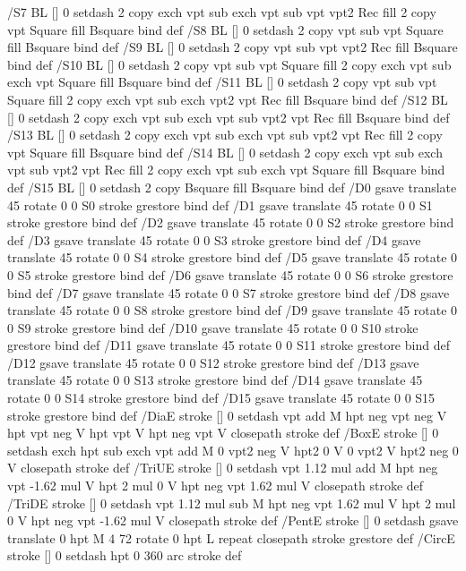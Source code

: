 /S7 {BL [] 0 setdash 2 copy exch vpt sub exch vpt sub vpt vpt2 Rec fill
	2 copy vpt Square fill Bsquare} bind def
/S8 {BL [] 0 setdash 2 copy vpt sub vpt Square fill Bsquare} bind def
/S9 {BL [] 0 setdash 2 copy vpt sub vpt vpt2 Rec fill Bsquare} bind def
/S10 {BL [] 0 setdash 2 copy vpt sub vpt Square fill 2 copy exch vpt sub exch vpt Square fill
	Bsquare} bind def
/S11 {BL [] 0 setdash 2 copy vpt sub vpt Square fill 2 copy exch vpt sub exch vpt2 vpt Rec fill
	Bsquare} bind def
/S12 {BL [] 0 setdash 2 copy exch vpt sub exch vpt sub vpt2 vpt Rec fill Bsquare} bind def
/S13 {BL [] 0 setdash 2 copy exch vpt sub exch vpt sub vpt2 vpt Rec fill
	2 copy vpt Square fill Bsquare} bind def
/S14 {BL [] 0 setdash 2 copy exch vpt sub exch vpt sub vpt2 vpt Rec fill
	2 copy exch vpt sub exch vpt Square fill Bsquare} bind def
/S15 {BL [] 0 setdash 2 copy Bsquare fill Bsquare} bind def
/D0 {gsave translate 45 rotate 0 0 S0 stroke grestore} bind def
/D1 {gsave translate 45 rotate 0 0 S1 stroke grestore} bind def
/D2 {gsave translate 45 rotate 0 0 S2 stroke grestore} bind def
/D3 {gsave translate 45 rotate 0 0 S3 stroke grestore} bind def
/D4 {gsave translate 45 rotate 0 0 S4 stroke grestore} bind def
/D5 {gsave translate 45 rotate 0 0 S5 stroke grestore} bind def
/D6 {gsave translate 45 rotate 0 0 S6 stroke grestore} bind def
/D7 {gsave translate 45 rotate 0 0 S7 stroke grestore} bind def
/D8 {gsave translate 45 rotate 0 0 S8 stroke grestore} bind def
/D9 {gsave translate 45 rotate 0 0 S9 stroke grestore} bind def
/D10 {gsave translate 45 rotate 0 0 S10 stroke grestore} bind def
/D11 {gsave translate 45 rotate 0 0 S11 stroke grestore} bind def
/D12 {gsave translate 45 rotate 0 0 S12 stroke grestore} bind def
/D13 {gsave translate 45 rotate 0 0 S13 stroke grestore} bind def
/D14 {gsave translate 45 rotate 0 0 S14 stroke grestore} bind def
/D15 {gsave translate 45 rotate 0 0 S15 stroke grestore} bind def
/DiaE {stroke [] 0 setdash vpt add M
  hpt neg vpt neg V hpt vpt neg V
  hpt vpt V hpt neg vpt V closepath stroke} def
/BoxE {stroke [] 0 setdash exch hpt sub exch vpt add M
  0 vpt2 neg V hpt2 0 V 0 vpt2 V
  hpt2 neg 0 V closepath stroke} def
/TriUE {stroke [] 0 setdash vpt 1.12 mul add M
  hpt neg vpt -1.62 mul V
  hpt 2 mul 0 V
  hpt neg vpt 1.62 mul V closepath stroke} def
/TriDE {stroke [] 0 setdash vpt 1.12 mul sub M
  hpt neg vpt 1.62 mul V
  hpt 2 mul 0 V
  hpt neg vpt -1.62 mul V closepath stroke} def
/PentE {stroke [] 0 setdash gsave
  translate 0 hpt M 4 {72 rotate 0 hpt L} repeat
  closepath stroke grestore} def
/CircE {stroke [] 0 setdash 
  hpt 0 360 arc stroke} def
